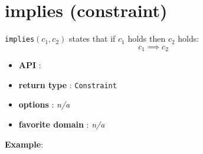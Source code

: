 \label{implies}
\hypertarget{implies}{}

\section{implies (constraint)}\label{implies:impliesconstraint}\hypertarget{implies:impliesconstraint}{}
\begin{notedef}
  \texttt{implies}$(c_1,c_2)$ states that if $c_1$ holds then $c_2$ holds:
$$c_1\implies c_2$$
\end{notedef}

\begin{itemize}
	\item \textbf{API} : 
	\item \textbf{return type} : \texttt{Constraint}
	\item \textbf{options} : \emph{n/a}
	\item \textbf{favorite domain} : \emph{n/a}
\end{itemize}

\textbf{Example}:

